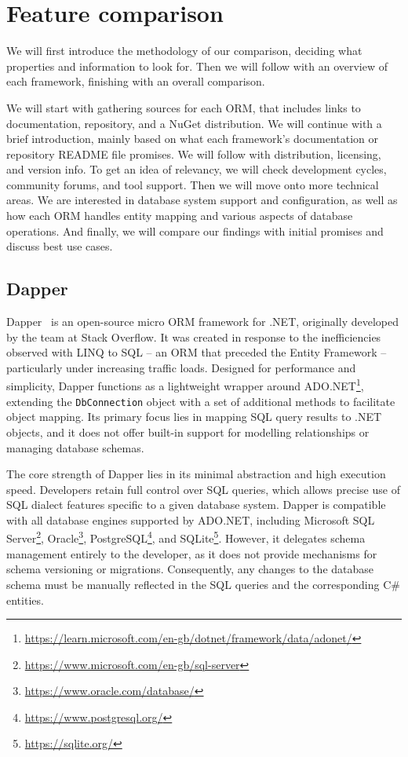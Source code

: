 \section{Feature comparison}
We will first introduce the methodology of our comparison, deciding what properties and information to look for. Then we will follow with an overview of each framework, finishing with an overall comparison.

We will start with gathering sources for each ORM, that includes links to documentation, repository, and a NuGet distribution. We will continue with a brief introduction, mainly based on what each framework's documentation or repository README file promises. We will follow with distribution, licensing, and version info. To get an idea of relevancy, we will check development cycles, community forums, and tool support. Then we will move onto more technical areas. We are interested in database system support and configuration, as well as how each ORM handles entity mapping and various aspects of database operations. And finally, we will compare our findings with initial promises and discuss best use cases.

\subsection{Dapper}\label{sec:feat_dapper}

Dapper~\cite{Dapper,DapperRepo} is an open-source micro ORM framework for .NET, originally developed by the team at Stack Overflow. It was created in response to the inefficiencies observed with LINQ to SQL -- an ORM that preceded the Entity Framework -- particularly under increasing traffic loads. Designed for performance and simplicity, Dapper functions as a lightweight wrapper around ADO.NET\footnote{\url{https://learn.microsoft.com/en-gb/dotnet/framework/data/adonet/}}, extending the \texttt{DbConnection} object with a set of additional methods to facilitate object mapping. Its primary focus lies in mapping SQL query results to .NET objects, and it does not offer built-in support for modelling relationships or managing database schemas.

The core strength of Dapper lies in its minimal abstraction and high execution speed. Developers retain full control over SQL queries, which allows precise use of SQL dialect features specific to a given database system. Dapper is compatible with all database engines supported by ADO.NET, including Microsoft SQL Server\footnote{\url{https://www.microsoft.com/en-gb/sql-server}}, Oracle\footnote{\url{https://www.oracle.com/database/}}, PostgreSQL\footnote{\url{https://www.postgresql.org/}}, and SQLite\footnote{\url{https://sqlite.org/}}. However, it delegates schema management entirely to the developer, as it does not provide mechanisms for schema versioning or migrations. Consequently, any changes to the database schema must be manually reflected in the SQL queries and the corresponding C\# entities.

